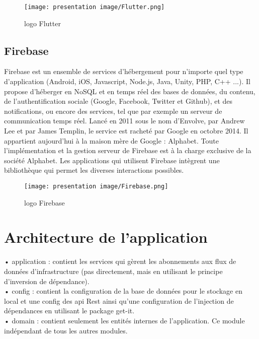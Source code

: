 \begin{figure}[!h]
\begin{center}
\texttt{[image: presentation image/Flutter.png]}
\end{center}
\caption{logo Flutter}
\end{figure}

\subsection{Firebase}
Firebase est un ensemble de services d'hébergement pour n'importe quel type d'application (Android, iOS, Javascript, Node.js, Java, Unity, PHP, C++ ...). Il propose d'héberger en NoSQL et en temps réel des bases de données, du contenu, de l'authentification sociale (Google, Facebook, Twitter et Github), et des notifications, ou encore des services, tel que par exemple un serveur de communication temps réel. Lancé en 2011 sous le nom d'Envolve, par Andrew Lee et par James Templin, le service est racheté par Google en octobre 2014. Il appartient aujourd'hui à la maison mère de Google : Alphabet. Toute l'implémentation et la gestion serveur de Firebase est à la charge exclusive de la société Alphabet. Les applications qui utilisent Firebase intègrent une bibliothèque qui permet les diverses interactions possibles.
\begin{figure}[!h]
\begin{center}
\texttt{[image: presentation image/Firebase.png]}
\end{center}
\caption{logo Firebase}
\end{figure}


\section{Architecture de l'application}


• application : contient les services qui gèrent les abonnements aux flux de données d'infrastructure (pas directement, mais en utilisant le principe d'inversion de dépendance).\\

• config : contient la configuration de la base de données pour le stockage en local et une config des api Rest ainsi qu’une configuration de l’injection de dépendances en utilisant le package get-it.\\

• domain : contient seulement les entités internes de l’application. Ce module indépendant de tous les autres modules.\\


